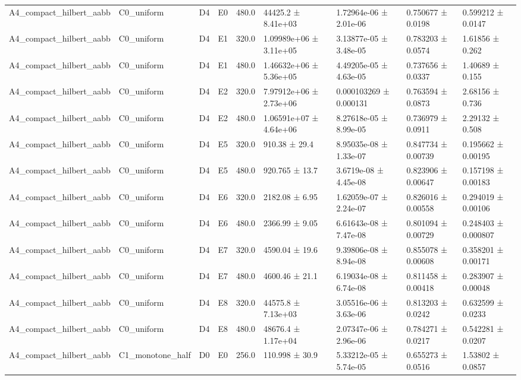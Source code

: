 \begin{table}
\begin{tabular}{lllllllll}
A4\_compact\_hilbert\_aabb & C0\_uniform & D4 & E0 & 480.0 & 44425.2 ± 8.41e+03 & 1.72964e-06 ± 2.01e-06 & 0.750677 ± 0.0198 & 0.599212 ± 0.0147 \\
A4\_compact\_hilbert\_aabb & C0\_uniform & D4 & E1 & 320.0 & 1.09989e+06 ± 3.11e+05 & 3.13877e-05 ± 3.48e-05 & 0.783203 ± 0.0574 & 1.61856 ± 0.262 \\
A4\_compact\_hilbert\_aabb & C0\_uniform & D4 & E1 & 480.0 & 1.46632e+06 ± 5.36e+05 & 4.49205e-05 ± 4.63e-05 & 0.737656 ± 0.0337 & 1.40689 ± 0.155 \\
A4\_compact\_hilbert\_aabb & C0\_uniform & D4 & E2 & 320.0 & 7.97912e+06 ± 2.73e+06 & 0.000103269 ± 0.000131 & 0.763594 ± 0.0873 & 2.68156 ± 0.736 \\
A4\_compact\_hilbert\_aabb & C0\_uniform & D4 & E2 & 480.0 & 1.06591e+07 ± 4.64e+06 & 8.27618e-05 ± 8.99e-05 & 0.736979 ± 0.0911 & 2.29132 ± 0.508 \\
A4\_compact\_hilbert\_aabb & C0\_uniform & D4 & E5 & 320.0 & 910.38 ± 29.4 & 8.95035e-08 ± 1.33e-07 & 0.847734 ± 0.00739 & 0.195662 ± 0.00195 \\
A4\_compact\_hilbert\_aabb & C0\_uniform & D4 & E5 & 480.0 & 920.765 ± 13.7 & 3.6719e-08 ± 4.45e-08 & 0.823906 ± 0.00647 & 0.157198 ± 0.00183 \\
A4\_compact\_hilbert\_aabb & C0\_uniform & D4 & E6 & 320.0 & 2182.08 ± 6.95 & 1.62059e-07 ± 2.24e-07 & 0.826016 ± 0.00558 & 0.294019 ± 0.00106 \\
A4\_compact\_hilbert\_aabb & C0\_uniform & D4 & E6 & 480.0 & 2366.99 ± 9.05 & 6.61643e-08 ± 7.47e-08 & 0.801094 ± 0.00729 & 0.248403 ± 0.000807 \\
A4\_compact\_hilbert\_aabb & C0\_uniform & D4 & E7 & 320.0 & 4590.04 ± 19.6 & 9.39806e-08 ± 8.94e-08 & 0.855078 ± 0.00608 & 0.358201 ± 0.00171 \\
A4\_compact\_hilbert\_aabb & C0\_uniform & D4 & E7 & 480.0 & 4600.46 ± 21.1 & 6.19034e-08 ± 6.74e-08 & 0.811458 ± 0.00418 & 0.283907 ± 0.00048 \\
A4\_compact\_hilbert\_aabb & C0\_uniform & D4 & E8 & 320.0 & 44575.8 ± 7.13e+03 & 3.05516e-06 ± 3.63e-06 & 0.813203 ± 0.0242 & 0.632599 ± 0.0233 \\
A4\_compact\_hilbert\_aabb & C0\_uniform & D4 & E8 & 480.0 & 48676.4 ± 1.17e+04 & 2.07347e-06 ± 2.96e-06 & 0.784271 ± 0.0217 & 0.542281 ± 0.0207 \\
A4\_compact\_hilbert\_aabb & C1\_monotone\_half & D0 & E0 & 256.0 & 110.998 ± 30.9 & 5.33212e-05 ± 5.74e-05 & 0.655273 ± 0.0516 & 1.53802 ± 0.0857 \\

\end{tabular}
\end{table}
